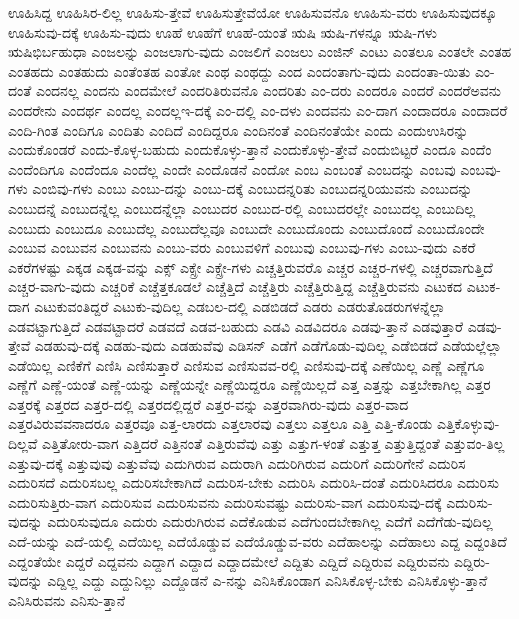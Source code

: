 {ಊಹಿಸಿದ್ದ
ಊಹಿಸಿರ-ಲಿಲ್ಲ
ಊಹಿಸು-ತ್ತೇವೆ
ಊಹಿಸುತ್ತೇವೆಯೋ
ಊಹಿಸುವನೊ
ಊಹಿಸು-ವರು
ಊಹಿಸುವುದಕ್ಕೂ
ಊಹಿಸುವು-ದಕ್ಕೆ
ಊಹಿಸು-ವುದು
ಊಹೆ
ಊಹೆಗೆ
ಊಹೆ-ಯಂತೆ
ಋಷಿ
ಋಷಿ-ಗಳನ್ನೂ
ಋಷಿ-ಗಳು
ಋಷಿಭಿರ್ಬಹುಧಾ
ಎಂಜಲನ್ನು
ಎಂಜಲಾಗು-ವುದು
ಎಂಜಲಿಗೆ
ಎಂಜಲು
ಎಂಜಿನ್
ಎಂಟು
ಎಂತಲೂ
ಎಂತಲೇ
ಎಂತಹ
ಎಂತಹದು
ಎಂತಹುದು
ಎಂತೆಂತಹ
ಎಂತೋ
ಎಂಥ
ಎಂಥದ್ದು
ಎಂದ
ಎಂದಂತಾಗು-ವುದು
ಎಂದಂತಾ-ಯಿತು
ಎಂ-ದಂತೆ
ಎಂದನಲ್ಲ
ಎಂದನು
ಎಂದಮೇಲೆ
ಎಂದರಿತಿರುವನೊ
ಎಂದರಿತು
ಎಂ-ದರು
ಎಂದರೂ
ಎಂದರೆ
ಎಂದರೆಅವನು
ಎಂದರೇನು
ಎಂದರ್ಥ
ಎಂದಲ್ಲ
ಎಂದಲ್ಲಇ-ದಕ್ಕೆ
ಎಂ-ದಲ್ಲಿ
ಎಂ-ದಳು
ಎಂದವನು
ಎಂ-ದಾಗ
ಎಂದಾದರೂ
ಎಂದಾದರೆ
ಎಂದಿ-ಗಿಂತ
ಎಂದಿಗೂ
ಎಂದಿತು
ಎಂದಿದೆ
ಎಂದಿದ್ದರೂ
ಎಂದಿನಂತೆ
ಎಂದಿನಂತೆಯೇ
ಎಂದು
ಎಂದುಉಸಿರನ್ನು
ಎಂದುಕೊಂಡರೆ
ಎಂದು-ಕೊಳ್ಳ-ಬಹುದು
ಎಂದುಕೊಳ್ಳು-ತ್ತಾನೆ
ಎಂದುಕೊಳ್ಳು-ತ್ತೇವೆ
ಎಂದುಬಿಟ್ಟರೆ
ಎಂದೂ
ಎಂದೆಂ
ಎಂದೆಂದಿಗೂ
ಎಂದೆಂದೂ
ಎಂದೆಲ್ಲ
ಎಂದೇ
ಎಂದೊಡನೆ
ಎಂದೋ
ಎಂಬ
ಎಂಬಂತೆ
ಎಂಬದನ್ನು
ಎಂಬವು
ಎಂಬವು-ಗಳು
ಎಂಬಿವು-ಗಳು
ಎಂಬು
ಎಂಬು-ದನ್ನು
ಎಂಬು-ದಕ್ಕೆ
ಎಂಬುದನ್ನರಿತು
ಎಂಬುದನ್ನರಿಯುವನು
ಎಂಬುದನ್ನು
ಎಂಬುದನ್ನೆ
ಎಂಬುದನ್ನೆಲ್ಲ
ಎಂಬುದನ್ನೆಲ್ಲಾ
ಎಂಬುದರ
ಎಂಬುದ-ರಲ್ಲಿ
ಎಂಬುದರಲ್ಲೇ
ಎಂಬುದಲ್ಲ
ಎಂಬುದಿಲ್ಲ
ಎಂಬುದು
ಎಂಬುದೂ
ಎಂಬುದೆಲ್ಲ
ಎಂಬುದೆಲ್ಲವೂ
ಎಂಬುದೇ
ಎಂಬುದೊಂದು
ಎಂಬುದೊಂದೆ
ಎಂಬುದೊಂದೇ
ಎಂಬುವ
ಎಂಬುವನ
ಎಂಬುವನು
ಎಂಬು-ವರು
ಎಂಬುವಳಿಗೆ
ಎಂಬುವು
ಎಂಬುವು-ಗಳು
ಎಂಬು-ವುದು
ಎಕರೆ
ಎಕರೆಗಳಷ್ಟು
ಎಕ್ಕಡ
ಎಕ್ಕಡ-ವನ್ನು
ಎಕ್ಸ್
ಎಕ್ಸ್ರೇ
ಎಕ್ಸ್ರೇ-ಗಳು
ಎಚ್ಚತ್ತಿರುವರೊ
ಎಚ್ಚರ
ಎಚ್ಚರ-ಗಳಲ್ಲಿ
ಎಚ್ಚರವಾಗುತ್ತಿದೆ
ಎಚ್ಚರ-ವಾಗು-ವುದು
ಎಚ್ಚರಿಕೆ
ಎಚ್ಚೆತ್ತಕೂಡಲೆ
ಎಚ್ಚೆತ್ತಿದೆ
ಎಚ್ಚೆತ್ತಿರು
ಎಚ್ಚೆತ್ತಿರುತ್ತಿದ್ದ
ಎಚ್ಚೆತ್ತಿರುವನು
ಎಟುಕದ
ಎಟುಕ-ದಾಗ
ಎಟುಕುವಂತಿದ್ದರೆ
ಎಟುಕು-ವುದಿಲ್ಲ
ಎಡಬಲ-ದಲ್ಲಿ
ಎಡಬಿಡದೆ
ಎಡರು
ಎಡರುತೊಡರುಗಳನ್ನೆಲ್ಲಾ
ಎಡವಟ್ಟಾಗುತ್ತಿದೆ
ಎಡವಟ್ಟಾದರೆ
ಎಡವದೆ
ಎಡವ-ಬಹುದು
ಎಡವಿ
ಎಡವಿದರೂ
ಎಡವು-ತ್ತಾನೆ
ಎಡವುತ್ತಾರೆ
ಎಡವು-ತ್ತೇವೆ
ಎಡಹುವು-ದಕ್ಕೆ
ಎಡಹು-ವುದು
ಎಡಹುವೆವು
ಎಡಿಸನ್
ಎಡೆಗೆ
ಎಡೆಗೊಡು-ವುದಿಲ್ಲ
ಎಡೆಬಿಡದೆ
ಎಡೆಯಲ್ಲೆಲ್ಲಾ
ಎಡೆಯಿಲ್ಲ
ಎಣಿಕೆಗೆ
ಎಣಿಸಿ
ಎಣಿಸುತ್ತಾರೆ
ಎಣಿಸುವ
ಎಣಿಸುವವ-ರಲ್ಲಿ
ಎಣಿಸುವು-ದಕ್ಕೆ
ಎಣೆಯಿಲ್ಲ
ಎಣ್ಣೆ
ಎಣ್ಣೆಗೂ
ಎಣ್ಣೆಗೆ
ಎಣ್ಣೆ-ಯಂತೆ
ಎಣ್ಣೆ-ಯನ್ನು
ಎಣ್ಣೆಯನ್ನೇ
ಎಣ್ಣೆಯಿದ್ದರೂ
ಎಣ್ಣೆಯಿಲ್ಲದೆ
ಎತ್ತ
ಎತ್ತನ್ನು
ಎತ್ತಬೇಕಾಗಿಲ್ಲ
ಎತ್ತರ
ಎತ್ತರಕ್ಕೆ
ಎತ್ತರದ
ಎತ್ತರ-ದಲ್ಲಿ
ಎತ್ತರದಲ್ಲಿದ್ದರೆ
ಎತ್ತರ-ವನ್ನು
ಎತ್ತರವಾಗಿರು-ವುದು
ಎತ್ತರ-ವಾದ
ಎತ್ತರವಿರುವವನಾದರೂ
ಎತ್ತರವೂ
ಎತ್ತ-ಲಾರದು
ಎತ್ತಲಾರವು
ಎತ್ತಲು
ಎತ್ತಲೂ
ಎತ್ತಿ
ಎತ್ತಿ-ಕೊಂಡು
ಎತ್ತಿಕೊಳ್ಳುವು-ದಿಲ್ಲವೆ
ಎತ್ತಿತೋರು-ವಾಗ
ಎತ್ತಿದರೆ
ಎತ್ತಿನಂತೆ
ಎತ್ತಿರುವೆವು
ಎತ್ತು
ಎತ್ತುಗ-ಳಂತೆ
ಎತ್ತುತ್ತ
ಎತ್ತುತ್ತಿದ್ದಂತೆ
ಎತ್ತುವಂ-ತಿಲ್ಲ
ಎತ್ತುವು-ದಕ್ಕೆ
ಎತ್ತುವುವು
ಎತ್ತುವೆವು
ಎದುಗಿರುವ
ಎದುರಾಗಿ
ಎದುರಿಗಿರುವ
ಎದುರಿಗೆ
ಎದುರಿಗೇನೆ
ಎದುರಿಸ
ಎದುರಿಸದೆ
ಎದುರಿಸಬಲ್ಲ
ಎದುರಿಸಬೇಕಾಗಿದೆ
ಎದುರಿಸ-ಬೇಕು
ಎದುರಿಸಿ
ಎದುರಿಸಿ-ದಂತೆ
ಎದುರಿಸಿದರೂ
ಎದುರಿಸು
ಎದುರಿಸುತ್ತಿರು-ವಾಗ
ಎದುರಿಸುವ
ಎದುರಿಸುವನು
ಎದುರಿಸುವಷ್ಟು
ಎದುರಿಸು-ವಾಗ
ಎದುರಿಸುವು-ದಕ್ಕೆ
ಎದುರಿಸು-ವುದನ್ನು
ಎದುರಿಸುವುದೂ
ಎದುರು
ಎದುರುಗಿರುವ
ಎದೆಕೊಡುವ
ಎದೆಗುಂದಬೇಕಾಗಿಲ್ಲ
ಎದೆಗೆ
ಎದೆಗೆಡು-ವುದಿಲ್ಲ
ಎದೆ-ಯನ್ನು
ಎದೆ-ಯಲ್ಲಿ
ಎದೆಯಿಲ್ಲ
ಎದೆಯೊಡ್ಡುವ
ಎದೆಯೊಡ್ಡುವ-ವರು
ಎದೆಹಾಲನ್ನು
ಎದೆಹಾಲು
ಎದ್ದ
ಎದ್ದಂತಿದೆ
ಎದ್ದಂತೆಯೇ
ಎದ್ದರೆ
ಎದ್ದವನು
ಎದ್ದಾಗ
ಎದ್ದಾದ
ಎದ್ದಾದಮೇಲೆ
ಎದ್ದಿತು
ಎದ್ದಿದೆ
ಎದ್ದಿರುವ
ಎದ್ದಿರುವನು
ಎದ್ದಿರು-ವುದನ್ನು
ಎದ್ದಿಲ್ಲ
ಎದ್ದು
ಎದ್ದುನಿಲ್ಲು
ಎದ್ದೊಡನೆ
ಎ-ನನ್ನು
ಎನಿಸಿಕೊಂಡಾಗ
ಎನಿಸಿಕೊಳ್ಳ-ಬೇಕು
ಎನಿಸಿಕೊಳ್ಳು-ತ್ತಾನೆ
ಎನಿಸಿರುವನು
ಎನಿಸು-ತ್ತಾನೆ
}
